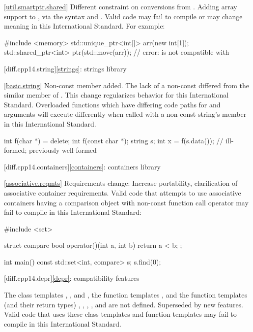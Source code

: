 \ref{util.smartptr.shared}
\change Different constraint on conversions from .
\rationale Adding array support to ,
via the syntax  and .
\effect
Valid \CppXIV code may fail to compile or may change meaning in this
International Standard.
For example:

\begin{codeblock}
#include <memory>
std::unique_ptr<int[]> arr(new int[1]);
std::shared_ptr<int> ptr(std::move(arr)); // error:  is not compatible with 
\end{codeblock}

[diff.cpp14.string]{\ref{strings}: strings library}

\ref{basic.string}
\change Non-const  member added.
\rationale The lack of a non-const 
differed from the similar member of .
This change regularizes behavior for this International Standard.
\effect
Overloaded functions which have differing code paths
for  and  arguments
will execute differently
when called with a non-const string's  member
in this International Standard.

\begin{codeblock}
int f(char *) = delete;
int f(const char *);
string s;
int x = f(s.data()); // ill-formed; previously well-formed
\end{codeblock}

[diff.cpp14.containers]{\ref{containers}: containers library}

\ref{associative.reqmts}
\change Requirements change:
\rationale Increase portability, clarification of associative container requirements.
\effect
Valid \CppXIV code that attempts to use associative containers
having a comparison object with non-const function call operator
may fail to compile in this International Standard:

\begin{codeblock}
#include <set>

struct compare
{
  bool operator()(int a, int b)
  {
    return a < b;
  }
};

int main() {
  const std::set<int, compare> s;
  s.find(0);
}
\end{codeblock}

[diff.cpp14.depr]{\ref{depr}: compatibility features}

\change
The class templates
,
, and
,
the function templates
,
and the function templates (and their return types)
,
,
,
, and
are not defined.
\rationale Superseded by new features.
\effect Valid \CppXIV code that uses these class templates
and function templates may fail to compile in this International Standard.

